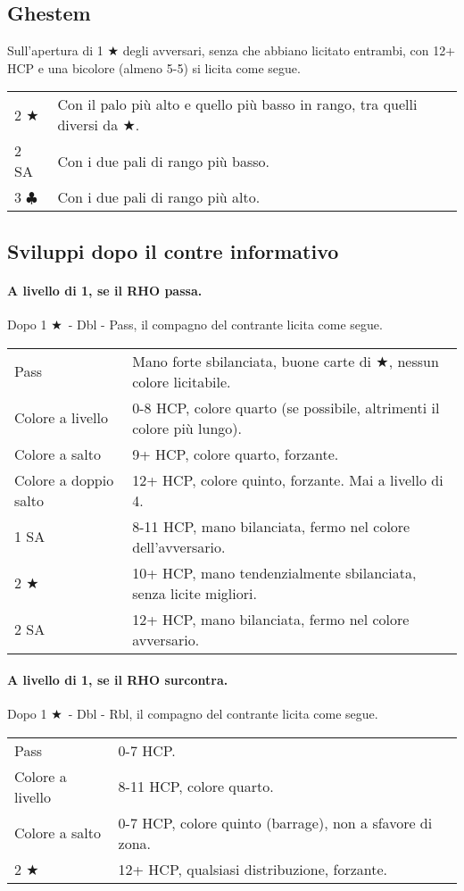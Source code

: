 \documentclass[a4paper,10pt]{article}
\renewcommand{\c}{$\clubsuit$\xspace}
\renewcommand{\j}{$\bigstar$\xspace}
\newcommand{\sa}{SA\xspace}
\newcommand{\smallspace}{\vskip0.3cm}
\newenvironment{twocol}
  {\smallspace\noindent\begin{tabular}{l p{0.78\textwidth}}}
  {\end{tabular}\smallspace}
\begin{document}
\subsection{Ghestem}
Sull'apertura di 1 \j degli avversari, senza che abbiano licitato entrambi, con 12+ HCP e una bicolore (almeno 5-5) si licita come segue.
\begin{twocol}
  2 \j & Con il palo più alto e quello più basso in rango, tra quelli diversi da \j.\\
  2 \sa & Con i due pali di rango più basso.\\
  3 \c & Con i due pali di rango più alto.
\end{twocol}

\subsection{Sviluppi dopo il contre informativo}

\paragraph{A livello di 1, se il RHO passa.} Dopo 1 \j\ - Dbl - Pass, il compagno del contrante licita come segue.

\begin{twocol}
	Pass & Mano forte sbilanciata, buone carte di \j, nessun colore licitabile. \\
	Colore a livello & 0-8 HCP, colore quarto (se possibile, altrimenti il colore più lungo). \\
	Colore a salto & 9+ HCP, colore quarto, forzante. \\
	Colore a doppio salto & 12+ HCP, colore quinto, forzante. Mai a livello di 4. \\
	1 \sa & 8-11 HCP, mano bilanciata, fermo nel colore dell'avversario. \\
	2 \j & 10+ HCP, mano tendenzialmente sbilanciata, senza licite migliori. \\
	2 \sa & 12+ HCP, mano bilanciata, fermo nel colore avversario. \\
\end{twocol}

\paragraph{A livello di 1, se il RHO surcontra.} Dopo 1 \j\ - Dbl - Rbl, il compagno del contrante licita come segue.

\begin{twocol}
	Pass & 0-7 HCP. \\
	Colore a livello & 8-11 HCP, colore quarto. \\
	Colore a salto & 0-7 HCP, colore quinto (barrage), non a sfavore di zona. \\
	2 \j & 12+ HCP, qualsiasi distribuzione, forzante. \\
\end{twocol}
\end{document}
